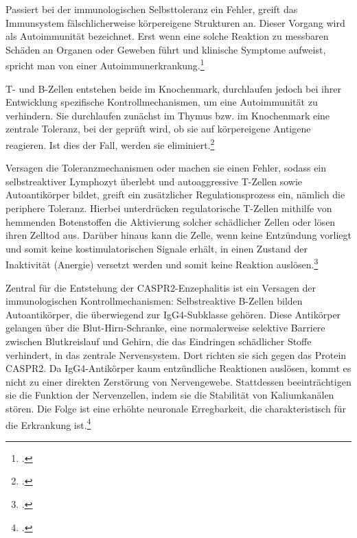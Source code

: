 Passiert bei der immunologischen Selbsttoleranz ein Fehler, greift das Immunsystem fälschlicherweise körpereigene Strukturen an. Dieser Vorgang wird als Autoimmunität bezeichnet. Erst wenn eine solche Reaktion zu messbaren Schäden an Organen oder Geweben führt und klinische Symptome aufweist, spricht man von einer Autoimmunerkrankung.\footcite{Fernandez2026}

T- und B-Zellen entstehen beide im Knochenmark, durchlaufen jedoch bei ihrer Entwicklung spezifische Kontrollmechanismen, um eine Autoimmunität zu verhindern. Sie durchlaufen zunächst im Thymus bzw. im Knochenmark eine zentrale Toleranz, bei der geprüft wird, ob sie auf körpereigene Antigene reagieren. Ist dies der Fall, werden sie eliminiert.\footcite{DocCheckLymphozyt}

Versagen die Toleranzmechanismen oder machen sie einen Fehler, sodass ein selbstreaktiver Lymphozyt überlebt und autoaggressive T-Zellen sowie Autoantikörper bildet, greift ein zusätzlicher Regulationsprozess ein, nämlich die periphere Toleranz. Hierbei unterdrücken regulatorische T-Zellen mithilfe von hemmenden Botenstoffen die Aktivierung solcher schädlicher Zellen oder lösen ihren Zelltod aus. Darüber hinaus kann die Zelle, wenn keine Entzündung vorliegt und somit keine kostimulatorischen Signale erhält, in einen Zustand der Inaktivität (Anergie) versetzt werden und somit keine Reaktion auslösen.\footcite{Macian2004}

Zentral für die Entstehung der CASPR2-Enzephalitis ist ein Versagen der immunologischen Kontrollmechanismen: Selbstreaktive B-Zellen bilden Autoantikörper, die überwiegend zur IgG4-Subklasse gehören. Diese Antikörper gelangen über die Blut-Hirn-Schranke, eine normalerweise selektive Barriere zwischen Blutkreislauf und Gehirn, die das Eindringen schädlicher Stoffe verhindert, in das zentrale Nervensystem. Dort richten sie sich gegen das Protein CASPR2. Da IgG4-Antikörper kaum entzündliche Reaktionen auslösen, kommt es nicht zu einer direkten Zerstörung von Nervengewebe. Stattdessen beeinträchtigen sie die Funktion der Nervenzellen, indem sie die Stabilität von Kaliumkanälen stören. Die Folge ist eine erhöhte neuronale Erregbarkeit, die charakteristisch für die Erkrankung ist.\footcite{Patterson2018}